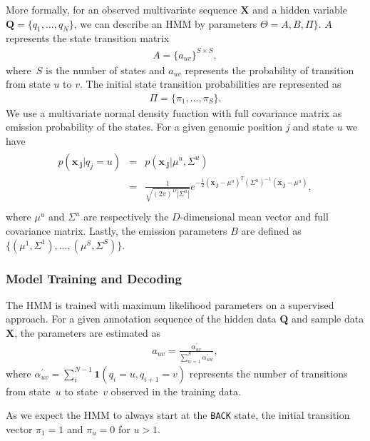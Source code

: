 \documentclass{bioinfo}
\begin{document}
\begin{methods}
More formally, for an observed multivariate sequence $\mathbf{X}$ and
a hidden variable $\mathbf{Q}=\{q_1,...,q_N\}$, we can describe an HMM
by parameters $\Theta= A,B,\Pi\}$. $A$ represents the state
transition matrix
\begin{align*}
    A = {\{a_{uv}\}}^{S \times S},
\end{align*}
where~$S$ is the number of states and $a_{uv}$ represents the
probability of transition from state $u$ to $v$. The initial state
transition probabilities are represented as
\begin{align*}
    \Pi = \{\pi_{1},...,\pi_{S}\}.
\end{align*}
We use a multivariate normal density function with full covariance matrix as emission probability
of the states. For a given genomic position $j$ and state $u$ we have
\begin{align}
    \begin{array}{lcl}
p(\mathbf{x_{\cdot j}}|q_j=u) & = & p(\mathbf{x_{\cdot j}}|{{\mu}^{u}},{{\Sigma}^{u}})\\[0.4em]
                          & = &
\frac{1}{ \sqrt{(2\pi)^{D} {| {{{\Sigma}^{u}}} |}}}
e^{-\frac{1}{2} (\mathbf{x_{\cdot j}}-\mu^u)^T (\Sigma^u)^{-1} (\mathbf{x_{\cdot j}}-\mu^u)}, \\
    \end{array}
    \label{eq:gaussian}
\end{align}
where $\mu^u$ and $\Sigma^u$ are respectively the $D$-dimensional
mean vector and full covariance matrix. Lastly, the emission parameters $B$ are
defined as $\{(\mu^1,\Sigma^1),...,(\mu^S,\Sigma^S)\}$.

\subsubsection{Model Training and Decoding}
\label{sec:hmm.training}

The HMM is trained with maximum likelihood parameters on a supervised
approach. For a given annotation sequence of the hidden data $\mathbf{Q}$ and
sample data $\mathbf{X}$, the parameters are estimated as
\begin{align}
    a_{uv} = \frac{ \alpha^{\prime}_{uv}}{ \sum_{w=1}^{S} \alpha^{\prime}_{uw}},
    \label{eq:train1}
\end{align}
where $\alpha^{\prime}_{uv}=\sum_i^{N-1} \mathbf{1} (q_i=u,q_{i+1}=v)$
represents the number of transitions from state~$u$ to state~$v$
observed in the training data. 

As we expect the HMM to always start at the {\tt BACK} state, the initial
transition vector $\pi_1=1$ and $\pi_u=0$ for $u > 1$. 


\end{methods}
\end{document}
